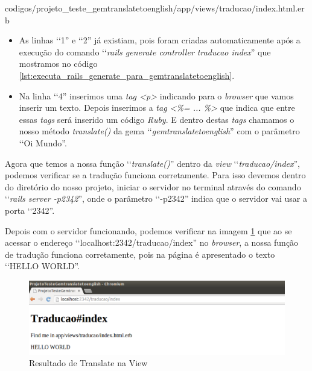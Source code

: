 
{codigos/projeto_teste_gemtranslatetoenglish/app/views/traducao/index.html.erb} 
 
 \begin{itemize}
 
  \item As linhas ‘‘1'' e ‘‘2'' já existiam, pois foram criadas automaticamente após a execução do comando 
  ‘‘\emph{rails generate controller traducao index}'' que mostramos no código
  \ref{lst:executa_rails_generate_para_gemtranslatetoenglish}.
  
  \item Na linha ‘‘4'' inserimos uma \emph{tag <p>} indicando para o \emph{browser} que vamos inserir um 
  texto. Depois inserimos a \emph{tag <\%= ... \%>} que indica que entre essas \emph{tags} será inserido um 
  código \emph{Ruby}. E dentro destas \emph{tags} chamamos o nosso método \emph{translate()} da gema 
  ‘‘\emph{gemtranslatetoenglish}'' com o parâmetro ‘‘Oi Mundo''.
  
 \end{itemize}

Agora que temos a nossa função ‘‘\emph{translate()}'' dentro da \emph{view} ‘‘\emph{traducao/index}'', podemos 
verificar se a tradução funciona corretamente. Para isso devemos dentro do diretório do nosso projeto,
iniciar o servidor no terminal através do comando ‘‘\emph{rails server -p2342}'', onde o parâmetro ‘‘-p2342'' 
indica que o servidor vai usar a porta ‘‘2342''. 

Depois com o servidor funcionando, podemos verificar na imagem \ref{fig:resultado_de_translate_na_view}
que ao se acessar o endereço ‘‘localhost:2342/traducao/index'' no \emph{browser}, a nossa função de
tradução funciona corretamente, pois na página é apresentado o texto ‘‘HELLO WORLD''.
 
 \begin{figure}[ht]
  \includegraphics[scale=0.49]{images/resultado_de_translate_na_view.png}
  \caption{Resultado de Translate na View}
  \label{fig:resultado_de_translate_na_view}
\end{figure}